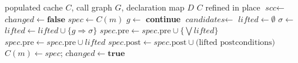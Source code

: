 \begin{algorithm}[t]
\caption{Compositional refinement.}
\label{alg:refine}
\small
\begin{algorithmic}[1]
\Require populated cache $C$, call graph $G$, declaration map $D$
\Ensure $C$ refined in place
\State $\textit{scc} \gets$ 
  \Repeat
    \State $\textit{changed} \gets \mathbf{false}$
      \State $\textit{spec} \gets C(m)$
        \State $g \gets$ 
          \State \textbf{continue} 
        \EndIf
        \State $\textit{candidates} \gets$ 
        \State $\textit{lifted} \gets \emptyset$
          \State $\sigma \gets$ 
          \State $\textit{lifted} \gets \textit{lifted} \cup \{ g \Rightarrow \sigma \}$
        \EndFor
          \State $\textit{spec}.\text{pre} \gets \textit{spec}.\text{pre} \cup \{\bigvee \textit{lifted}\}$
        \Else
          \State $\textit{spec}.\text{pre} \gets \textit{spec}.\text{pre} \cup \textit{lifted}$
        \EndIf
          \State $\textit{spec}.\text{post} \gets \textit{spec}.\text{post} \cup \text{(lifted postconditions)}$
        \EndIf
      \EndFor
       $C(m) \gets \textit{spec}$; $\textit{changed} \gets \mathbf{true}$
      \EndIf
    \EndFor
\EndFor
\end{algorithmic}
\end{algorithm}

